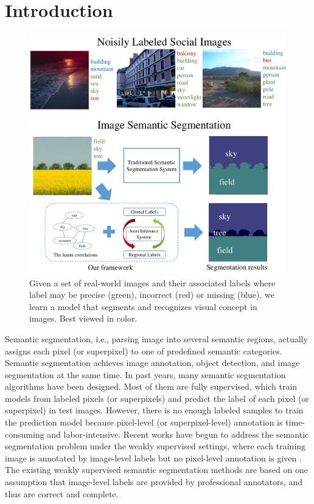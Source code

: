 \section{Introduction}

\begin{figure}[t]
\begin{center}
    \includegraphics[width=1\linewidth]{fig_noisyparsing.pdf}
\end{center}
    \caption{Given a set of real-world images and their associated labels where label may be precise (green), incorrect (red) or missing (blue), we learn a model that segments and recognizes visual concept in images. Best viewed in color.}
\label{fig:noisyparsing}
\vspace{-3mm}
\end{figure}

Semantic segmentation, i.e., parsing image into several semantic regions, actually assigns each pixel (or  superpixel) to one of predefined semantic categories. Semantic segmentation achieves image annotation, object detection, and image segmentation at the same time.  In past years, many semantic segmentation algorithms have been designed. Most of  them are fully supervised, which train models from labeled pixels (or  superpixels) and predict  the label of each pixel (or  superpixel) in test images. However, there is no enough labeled samples to train the prediction model because pixel-level (or  superpixel-level) annotation is time-consuming and labor-intensive.
Recent works have begun to address the semantic segmentation problem under the weakly supervised settings, where each training image is annotated by image-level labels  but no pixel-level annotation is given \cite{verbeek2007region,vezhnevets2010towards,vezhnevets2011weakly,vezhnevets2012weakly,xu2014tell,zhang2013sparse,zhang2013probabilistic}. The existing weakly supervised semantic  segmentation methods are based on one assumption that image-level labels are provided by professional annotators, and thus are correct and complete.

